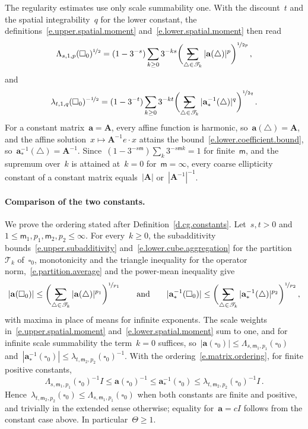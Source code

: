 \documentclass[11pt,letterpaper]{article}
\makeatletter
\numberwithin{equation}{section}
\theoremstyle{definition}
\renewcommand{\a}{\mathbf{a}}
\newcommand{\bfA}{\mathbf{A}}
\newcommand{\nf}{\nicefrac}
\newcommand{\cu}{\square}
\newcommand{\avsum}{\mathop{\mathpalette\avsuminner\relax}\displaylimits}
\newcommand\avsuminner[2]{%
	{\sbox0{$\m@th#1\sum$}%
		\vphantom{\usebox0}%
		\ooalign{%
			\hidewidth
			\smash{\,\rule[.23em]{8.8pt}{1.1pt} \relax}%
			\hidewidth\cr
			$\m@th#1\sum$\cr
		}%
	}%
}
\makeatother
\begin{document}
The regularity estimates use only scale summability one. With the discount~$t$ and the spatial integrability~$q$ for the lower constant, the definitions~\eqref{e.upper.spatial.moment} and~\eqref{e.lower.spatial.moment} then read
\begin{equation}
	\Lambda_{s,1,p}(\cu_0)^{\nf12}=(1-3^{-s})\sum_{k\geq0}3^{-ks}\biggl(\avsum_{\triangle\in\mathscr T_k}|\a(\triangle)|^p\biggr)^{\nf1{2p}}\,,
	\label{e.upper.half.series}
\end{equation}
and
\begin{equation}
	\lambda_{t,1,q}(\cu_0)^{-\nf12}=(1-3^{-t})\sum_{k\geq0}3^{-kt}\biggl(\avsum_{\triangle\in\mathscr T_k}|\a_*^{-1}(\triangle)|^q\biggr)^{\nf1{2q}}\,.
	\label{e.lower.half.series}
\end{equation}
For a constant matrix~$\a=\bfA$, every affine function is harmonic, so~$\a(\triangle)=\bfA$, and the affine solution~$x\mapsto\bfA^{-1}e\cdot x$ attains the bound~\eqref{e.lower.coefficient.bound}, so~$\a_*^{-1}(\triangle)=\bfA^{-1}$. Since~$(1-3^{-s\mathsf m})\sum_k3^{-s\mathsf mk}=1$ for finite~$\mathsf m$, and the supremum over~$k$ is attained at~$k=0$ for~$\mathsf m=\infty$, every coarse ellipticity constant of a constant matrix equals~$|\bfA|$ or~$|\bfA^{-1}|^{-1}$.

\paragraph{Comparison of the two constants.} We prove the ordering stated after Definition~\ref{d.cg.constants}. Let~$s,t>0$ and~$1\leq \mathsf m_1,p_1,\mathsf m_2,p_2\leq\infty$. For every~$k\geq0$, the subadditivity bounds~\eqref{e.upper.subadditivity} and~\eqref{e.lower.cube.aggregation} for the partition~$\mathscr T_k$ of~$\cu_0$, monotonicity and the triangle inequality for the operator norm,~\eqref{e.partition.average} and the power-mean inequality give
\begin{equation*}
	|\a(\cu_0)|\leq\biggl(\avsum_{\triangle\in\mathscr T_k}|\a(\triangle)|^{p_1}\biggr)^{\nf1{p_1}}\qquad\mbox{and}\qquad|\a_*^{-1}(\cu_0)|\leq\biggl(\avsum_{\triangle\in\mathscr T_k}|\a_*^{-1}(\triangle)|^{p_2}\biggr)^{\nf1{p_2}}\,,
\end{equation*}
with maxima in place of means for infinite exponents. The scale weights in~\eqref{e.upper.spatial.moment} and~\eqref{e.lower.spatial.moment} sum to one, and for infinite scale summability the term~$k=0$ suffices, so~$|\a(\cu_0)|\leq\Lambda_{s,\mathsf m_1,p_1}(\cu_0)$ and~$|\a_*^{-1}(\cu_0)|\leq\lambda_{t,\mathsf m_2,p_2}(\cu_0)^{-1}$. With the ordering~\eqref{e.matrix.ordering}, for finite positive constants,
\begin{equation}
	\Lambda_{s,\mathsf m_1,p_1}(\cu_0)^{-1}I\leq\a(\cu_0)^{-1}\leq\a_*^{-1}(\cu_0)\leq\lambda_{t,\mathsf m_2,p_2}(\cu_0)^{-1}I\,.
	\label{e.moment.comparison}
\end{equation}
Hence~$\lambda_{t,\mathsf m_2,p_2}(\cu_0)\leq\Lambda_{s,\mathsf m_1,p_1}(\cu_0)$ when both constants are finite and positive, and trivially in the extended sense otherwise; equality for~$\a=cI$ follows from the constant case above. In particular~$\Theta\geq1$.
\end{document}
